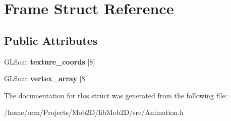\hypertarget{structFrame}{
\section{Frame Struct Reference}
\label{structFrame}
}
\subsection*{Public Attributes}
\begin{DoxyCompactItemize}
\item 
\hypertarget{structFrame_ae4aebca52b1220a7af258cb6cba3933c}{
GLfloat {\bfseries texture\_\-coords} \mbox{[}8\mbox{]}}
\label{structFrame_ae4aebca52b1220a7af258cb6cba3933c}

\item 
\hypertarget{structFrame_ad12c2cb2387db6a1e207a08f585f637c}{
GLfloat {\bfseries vertex\_\-array} \mbox{[}8\mbox{]}}
\label{structFrame_ad12c2cb2387db6a1e207a08f585f637c}

\end{DoxyCompactItemize}


The documentation for this struct was generated from the following file:\begin{DoxyCompactItemize}
\item 
/home/orm/Projects/Mob2D/libMob2D/src/Animation.h\end{DoxyCompactItemize}
